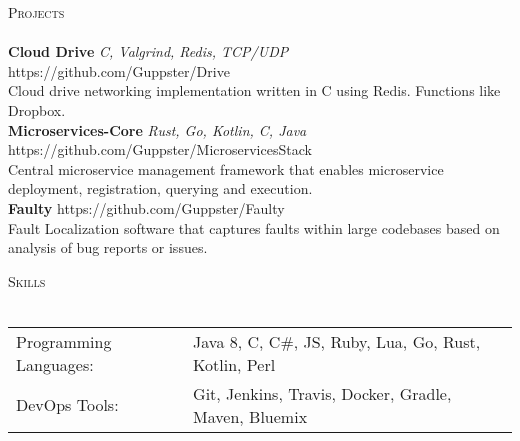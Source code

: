 \documentclass[a4paper]{article}
\newcommand{\lineunder} {
    \vspace*{-8pt} \\
    \hspace*{-18pt} \hrulefill \\
}
\newcommand{\header} [1] {
    {\hspace*{-18pt}\vspace*{6pt} \textsc{#1}}
    \vspace*{-6pt} \lineunder
}
\begin{document}
\header{Projects}	
{\textbf{Cloud Drive} \sl C, Valgrind, Redis, TCP/UDP} \hfill https://github.com/Guppster/Drive\\	
\vspace*{1mm}	
Cloud drive networking implementation written in C using Redis. Functions like Dropbox.\\	
\vspace*{2mm}	
{\textbf{Microservices-Core} \sl Rust, Go, Kotlin, C, Java} \hfill https://github.com/Guppster/MicroservicesStack\\	
\vspace*{1mm}	
Central microservice management framework that enables microservice deployment, registration, querying and execution.\\	
\vspace*{2mm}	
{\textbf{Faulty} \sl } \hfill https://github.com/Guppster/Faulty\\	
\vspace*{1mm}	
Fault Localization software that captures faults within large codebases based on analysis of bug reports or issues.\\	
\vspace*{2mm}	

\header{Skills}
\begin{tabular}{ l l }
	Programming Languages: & Java 8, C, C\#, JS, Ruby, Lua, Go, Rust, Kotlin, Perl \\
	DevOps Tools:          & Git, Jenkins, Travis, Docker, Gradle, Maven, Bluemix \\
\end{tabular}
\end{document}
